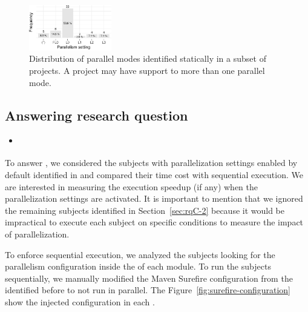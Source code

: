 \begin{figure}[h!]
    \centering
    \includegraphics[width=0.32\textwidth]{plots/barplot-modes-static.pdf}
    \caption{\label{fig:freqmodes-static}Distribution of parallel modes 
    identified statically in a subset of \numProjectsPar{} projects.
    A project may have support to more than one parallel mode.}
\end{figure}

\begin{center}
\end{center}

\subsection{Answering research question \numRQD{}}
\label{sec:rqD}

\begin{itemize}
    \item \emph{\RQD}
\end{itemize}

To answer \numRQD{}, we considered the \numProjectsPar{} subjects with
parallelization settings enabled by default identified in \numRQC{}
and compared their time cost with sequential execution. We are
interested in measuring the execution speedup (if any) when the
parallelization settings are activated. It is important to mention
that we ignored the remaining  subjects identified in
Section~\ref{sec:rqC-2} because it would be impractical to execute
each subject on specific conditions to measure the impact of
parallelization.

To enforce sequential execution,  we 
analyzed the \numProjectsPar{} subjects looking for the parallelism 
configuration inside the \pomf{} of each module. To run the subjects
sequentially, we manually modified the Maven Surefire configuration
from the \numPomMatchedValid{} identified before to not run in parallel.
The Figure~\ref{fig:surefire-configuration} show the injected configuration
in each \pomf{}.

